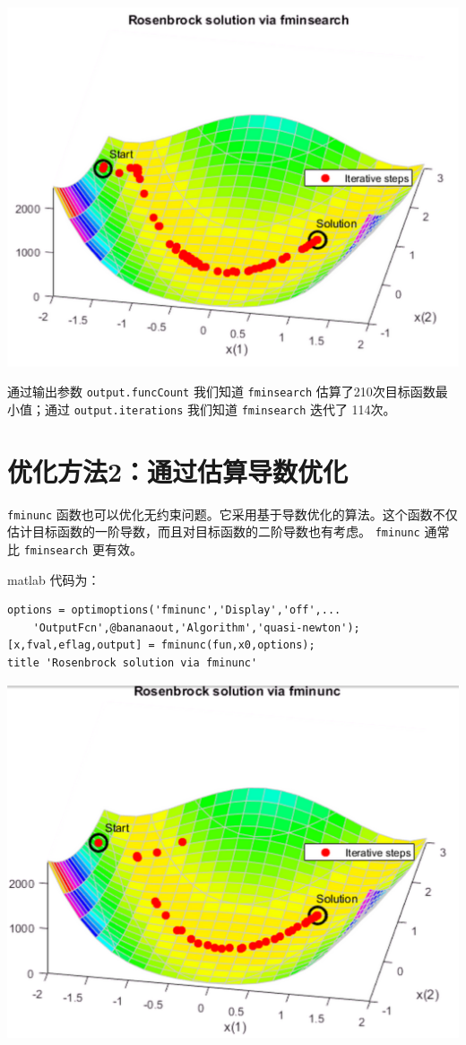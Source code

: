 \documentclass[10pt,a4paper,UTF8]{article}
\begin{document}
\begin{center}
\includegraphics[width=.9\linewidth]{../../img/communication_matlab/20171014rosenbrockfminsearch.png}
\end{center}

通过输出参数  \texttt{output.funcCount} 我们知道 \texttt{fminsearch} 估算了210次目标函数最小值；通过 \texttt{output.iterations} 我们知道 \texttt{fminsearch} 迭代了 114次。
\section{优化方法2：通过估算导数优化}
\label{sec:org118c382}


\texttt{fminunc} 函数也可以优化无约束问题。它采用基于导数优化的算法。这个函数不仅估计目标函数的一阶导数，而且对目标函数的二阶导数也有考虑。 \texttt{fminunc} 通常比 \texttt{fminsearch} 更有效。

matlab 代码为：
\lstset{language=matlab,label= ,caption= ,captionpos=b,numbers=none}
\begin{lstlisting}
options = optimoptions('fminunc','Display','off',...
    'OutputFcn',@bananaout,'Algorithm','quasi-newton');
[x,fval,eflag,output] = fminunc(fun,x0,options);
title 'Rosenbrock solution via fminunc'
\end{lstlisting}


\begin{center}
\includegraphics[width=.9\linewidth]{../../img/communication_matlab/20171014rosenbrockfminunc.png}
\end{center}
\end{document}
